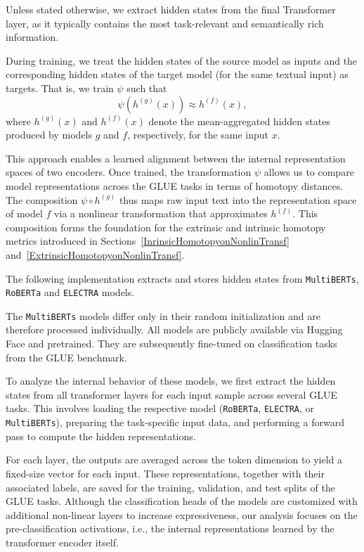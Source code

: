 Unless stated otherwise, we extract hidden states from the final Transformer layer, as it typically contains the most task-relevant and semantically rich information.

During training, we treat the hidden states of the source model as inputs and the corresponding hidden states of the target model (for the same textual input) as targets.
That is, we train \( \psi \) such that
\[
\psi(h^{(g)}(x)) \approx h^{(f)}(x),
\]
where \( h^{(g)}(x) \) and \( h^{(f)}(x) \) denote the mean-aggregated hidden states produced by models \( g \) and \( f \), respectively, for the same input \( x \).

This approach enables a learned alignment between the internal representation spaces of two encoders.
Once trained, the transformation \( \psi \) allows us to compare model representations across the \ac{GLUE} tasks in terms of homotopy distances.
The composition \( \psi \circ h^{(g)} \) thus maps raw input text into the representation space of model \( f \) via a nonlinear transformation that approximates \( h^{(f)} \).
This composition forms the foundation for the extrinsic and intrinsic homotopy metrics introduced in Sections~\ref{InrinsicHomotopyonNonlinTransf} and~\ref{ExtrinsicHomotopyonNonlinTransf}.

The following implementation extracts and stores hidden states from \texttt{MultiBERTs}, \texttt{RoBERTa} and \texttt{ELECTRA}  models.

The \texttt{MultiBERTs} models differ only in their random initialization and are therefore processed individually.
All models are publicly available via Hugging Face and pretrained.
They are subsequently fine-tuned on classification tasks from the \ac{GLUE} benchmark.


To analyze the internal behavior of these models, we first extract the hidden states from all transformer layers for each input sample across several \ac{GLUE} tasks. This involves loading the respective model (\texttt{RoBERTa}, \texttt{ELECTRA}, or \texttt{MultiBERTs}), preparing the task-specific input data, and performing a forward pass to compute the hidden representations.

For each layer, the outputs are averaged across the token dimension to yield a fixed-size vector for each input. These representations, together with their associated labels, are saved for the training, validation, and test splits of the GLUE tasks.
Although the classification heads of the models are customized with additional non-linear layers to increase expressiveness, our analysis focuses on the pre-classification activations, i.e., the internal representations learned by the transformer encoder itself.


